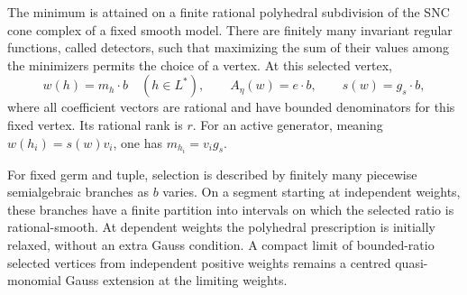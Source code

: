 \begin{proposition}\label{val:optimization}
The minimum is attained on a finite rational polyhedral subdivision
of the SNC cone complex of a fixed smooth model. There are finitely
many invariant regular functions, called detectors, such that
maximizing the sum of their values among the minimizers permits the
choice of a vertex. At this selected vertex,
\begin{equation}\label{val:coefficient-vectors}
 w(h)=m_h\cdot b\quad(h\in L^*),\qquad
 A_\eta(w)=e\cdot b,\qquad s(w)=g_s\cdot b,
\end{equation}
where all coefficient vectors are rational and have bounded
denominators for this fixed vertex. Its rational rank is $r$.
For an active generator, meaning $w(h_i)=s(w)v_i$, one has
$m_{h_i}=v_i g_s$.

For fixed germ and tuple, selection is described by finitely many
piecewise semialgebraic branches as $b$ varies. On a segment starting
at independent weights, these branches have a finite partition into
intervals on which the selected ratio is rational-smooth. At
dependent weights the polyhedral prescription is initially relaxed,
without an extra Gauss condition. A compact limit of bounded-ratio
selected vertices from independent positive weights remains a
centred quasi-monomial Gauss extension at the limiting weights.
\end{proposition}

